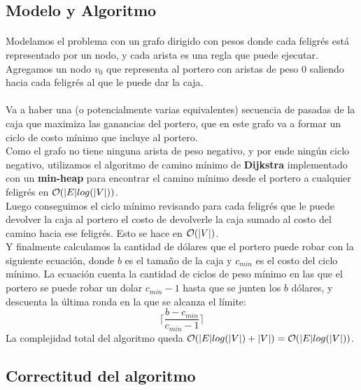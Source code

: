 \documentclass[../main.tex]{subfiles}
\begin{document}
\subsection{Modelo y Algoritmo}
\label{sec:ej3-model}
\paragraph{} Modelamos el problema con un grafo dirigido con pesos donde cada feligrés está representado por un nodo, y cada arista es una regla que puede ejecutar. Agregamos un nodo \(v_{0}\) que representa al portero con aristas de peso 0 saliendo hacia cada feligrés al que le puede dar la caja.

\paragraph{} Va a haber una (o potencialmente varias equivalentes) secuencia de pasadas de la caja que maximiza las ganancias del portero, que en este grafo va a formar un ciclo de costo mínimo que incluye al portero. \\
Como el grafo no tiene ninguna arista de peso negativo, y por ende ningún ciclo negativo, utilizamos el algoritmo de camino mínimo de \textbf{Dijkstra} implementado con un \textbf{min-heap} para encontrar el camino mínimo desde el portero a cualquier feligrés en \(\mathcal{O}(|E|log(|V|))\). \\
Luego conseguimos el ciclo mínimo revisando para cada feligrés que le puede devolver la caja al portero el costo de devolverle la caja sumado al costo del camino hacia ese feligrés. Esto se hace en \(\mathcal{O}(|V|)\). \\
Y finalmente calculamos la cantidad de dólares que el portero puede robar  con la siguiente ecuación, donde \(b\) es el tamaño de la caja y \(c_{min}\) es el costo del ciclo mínimo. La ecuación cuenta la cantidad de ciclos de peso mínimo en las que el portero se puede robar un dolar \(c_{min} - 1\) hasta que se junten los \(b\) dólares, y descuenta la última ronda en la que se alcanza el límite: \\
\[
  \Big\lceil\dfrac{b - c_{min}}{c_{min}-1}\Big\rceil
  \]
La complejidad total del algoritmo queda \(\mathcal{O}(|E|log(|V|) + |V|) = \mathcal{O}(|E|log(|V|))\).

\subsection{Correctitud del algoritmo}
\label{sec:ej3-proof}
\end{document}
